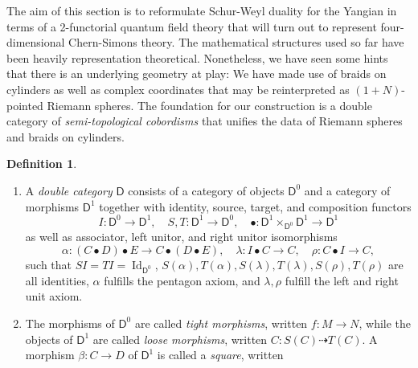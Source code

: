 \documentclass[11pt]{report}
\theoremstyle{definition}
\newtheorem{definition}[theorem]{Definition}
\theoremstyle{remark}
\theoremstyle{remark}
\begin{document}
The aim of this section is to reformulate Schur-Weyl duality for the Yangian in terms of a 2-functorial quantum field theory that will turn out to represent four-dimensional Chern-Simons theory. The mathematical structures used so far have been heavily representation theoretical. Nonetheless, we have seen some hints that there is an underlying geometry at play: We have made use of braids on cylinders as well as complex coordinates that may be reinterpreted as $(1+N)$-pointed Riemann spheres. The foundation for our construction is a double category of \emph{semi-topological cobordisms} that unifies the data of Riemann spheres and braids on cylinders.

\begin{definition}
\begin{enumerate}[label=(\roman*)]
\item A \emph{double category} $\mathsf{D}$ consists of a category of objects $\mathsf{D}^0$ and a category of morphisms $\mathsf{D}^1$ together with identity, source, target, and composition functors
\begin{equation*}
I: \mathsf{D}^0 \to \mathsf{D}^1, \quad S,T: \mathsf{D}^1 \to \mathsf{D}^0, \quad \bullet: \mathsf{D}^1 \times_{\mathsf{D}^0} \mathsf{D}^1 \to \mathsf{D}^1
\end{equation*}
as well as associator, left unitor, and right unitor isomorphisms
\begin{equation*}
\alpha: (C \bullet D) \bullet E \to C \bullet (D \bullet E), \quad \lambda: I \bullet C \to C, \quad \rho: C \bullet I \to C,
\end{equation*}
such that $SI = TI = \operatorname{Id}_{\mathsf{D}^0}$, $S(\alpha), T(\alpha), S(\lambda), T(\lambda), S(\rho), T(\rho)$ are all identities, $\alpha$ fulfills the pentagon axiom, and $\lambda, \rho$ fulfill the left and right unit axiom.
\item The morphisms of $\mathsf{D}^0$ are called \emph{tight morphisms}, written $f: M \to N$, while the objects of $\mathsf{D}^1$ are called \emph{loose morphisms}, written $C: S(C) \dashrightarrow T(C)$. A morphism $\beta: C \to D$ of $\mathsf{D}^1$ is called a \emph{square}, written
\begin{center}

\end{center}
\end{enumerate}
\end{definition}
\end{document}
